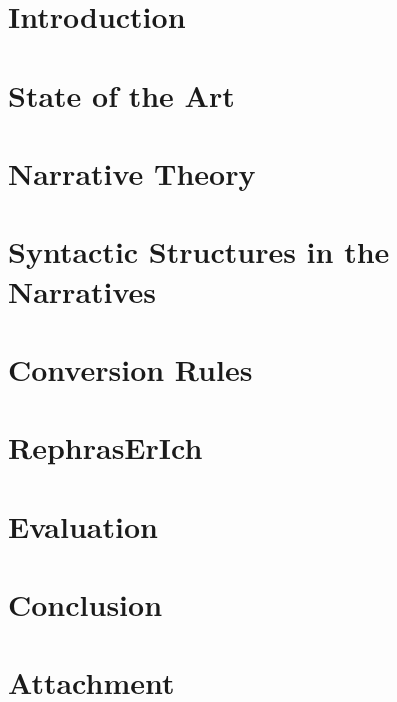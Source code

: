 \documentclass[digital, oneside, table, nolot, nolof]{fithesis4}
\begin{document}

\chapter{Introduction} \label{chap:uvod}


\chapter{State of the Art} \label{chap:state-of-art}


\chapter{Narrative Theory} \label{chap:teorie-vypraveni}


\chapter{Syntactic Structures in the Narratives} \label{chap:syntax}


\chapter{Conversion Rules} \label{chap:navrh-pravidel}


\chapter{RephrasErIch} \label{chap:rerich}


\chapter{Evaluation} \label{chap:evaluace}


\chapter{Conclusion} \label{chap:zaver}


\printbibliography

\appendix
\chapter{Attachment} \label{chap:appendix}

\end{document}
